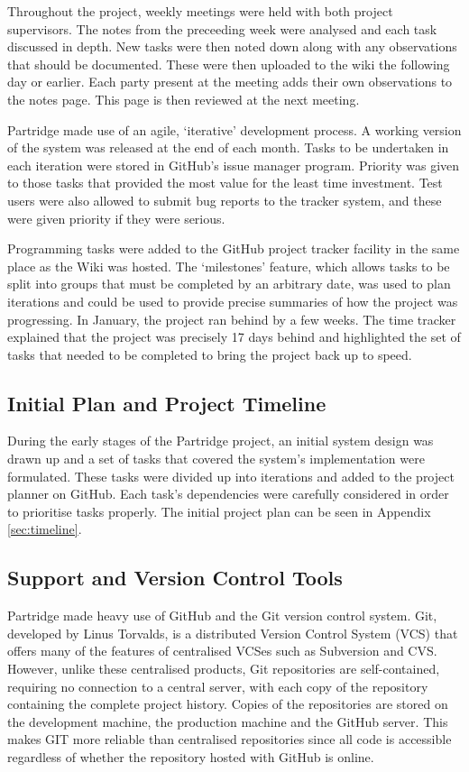 Throughout the project, weekly meetings were held with both project
supervisors. The notes from the preceeding week were analysed and each task
discussed in depth. New tasks were then noted down along with any observations
that should be documented. These were then uploaded to the wiki the following
day or earlier. Each party present at the meeting adds their own observations
to the notes page. This page is then reviewed at the next meeting.

Partridge made use of an agile, `iterative' development process. A working
version of the system was released at the end of each month. Tasks to be
undertaken in each iteration were stored in GitHub's issue manager program.
Priority was given to those tasks that provided the most value for the least
time investment. Test users were also allowed to submit bug reports to the
tracker system, and these were given priority if they were serious.

Programming tasks were added to the GitHub project tracker facility in the
same place as the Wiki was hosted. The `milestones' feature, which allows tasks
to be split into groups that must be completed by an arbitrary date, was used
to plan iterations and could be used to provide precise summaries of how the
project was progressing. In January, the project ran behind by a few weeks.
The time tracker explained that the project was precisely 17 days behind and
highlighted the set of tasks that needed to be completed to bring the project
back up to speed.

\subsection{ Initial Plan and Project Timeline }

During the early stages of the Partridge project, an initial system design was
drawn up and a set of tasks that covered the system's implementation were
formulated. These tasks were divided up into iterations and added to the
project planner on GitHub. Each task's dependencies were carefully considered
in order to prioritise tasks properly. The initial project plan can be seen in
Appendix \ref{sec:timeline}. 

\subsection{Support and Version Control Tools}

Partridge made heavy use of GitHub and the Git version control system. Git,
developed by Linus Torvalds, is a distributed Version Control System (VCS) that
offers many of the features of centralised VCSes such as Subversion and CVS.
However, unlike these centralised products, Git repositories are
self-contained, requiring no connection to a central server, with each copy of
the repository containing the complete project history. Copies of the
repositories are stored on the development machine, the production machine and
the GitHub server. This makes GIT more reliable than centralised repositories
since all code is accessible regardless of whether the repository hosted with
GitHub is online.

